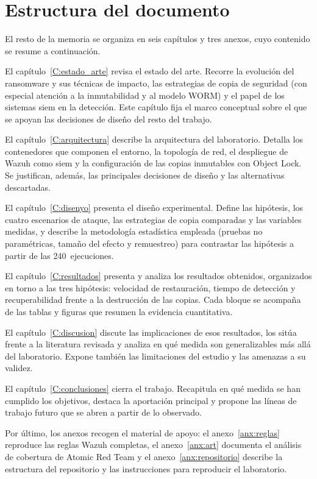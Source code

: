 \documentclass[../main.tex]{subfiles}
\begin{document}
\section{Estructura del documento}

El resto de la memoria se organiza en seis capítulos y tres anexos, cuyo
contenido se resume a continuación.

El capítulo~\ref{C:estado_arte} revisa el estado del arte. Recorre la
evolución del ransomware y sus técnicas de impacto, las estrategias de
copia de seguridad (con especial atención a la inmutabilidad y al modelo
WORM) y el papel de los sistemas \gls{siem} en la detección. Este capítulo
fija el marco conceptual sobre el que se apoyan las decisiones de diseño
del resto del trabajo.

El capítulo~\ref{C:arquitectura} describe la arquitectura del laboratorio.
Detalla los contenedores que componen el entorno, la topología de red, el
despliegue de Wazuh como \gls{siem} y la configuración de las copias
inmutables con Object Lock. Se justifican, además, las principales
decisiones de diseño y las alternativas descartadas.

El capítulo~\ref{C:disenyo} presenta el diseño experimental. Define las
hipótesis, los cuatro escenarios de ataque, las estrategias de copia
comparadas y las variables medidas, y describe la metodología estadística
empleada (pruebas no paramétricas, tamaño del efecto y remuestreo) para
contrastar las hipótesis a partir de las 240~ejecuciones.

El capítulo~\ref{C:resultados} presenta y analiza los resultados obtenidos,
organizados en torno a las tres hipótesis: velocidad de restauración,
tiempo de detección y recuperabilidad frente a la destrucción de las
copias. Cada bloque se acompaña de las tablas y figuras que resumen la
evidencia cuantitativa.

El capítulo~\ref{C:discusion} discute las implicaciones de esos resultados,
los sitúa frente a la literatura revisada y analiza en qué medida son
generalizables más allá del laboratorio. Expone también las limitaciones
del estudio y las amenazas a su validez.

El capítulo~\ref{C:conclusiones} cierra el trabajo. Recapitula en qué
medida se han cumplido los objetivos, destaca la aportación principal y
propone las líneas de trabajo futuro que se abren a partir de lo
observado.

Por último, los anexos recogen el material de apoyo: el
anexo~\ref{anx:reglas} reproduce las reglas Wazuh completas, el
anexo~\ref{anx:art} documenta el análisis de cobertura de Atomic Red Team
y el anexo~\ref{anx:repositorio} describe la estructura del repositorio y
las instrucciones para reproducir el laboratorio.
\end{document}
